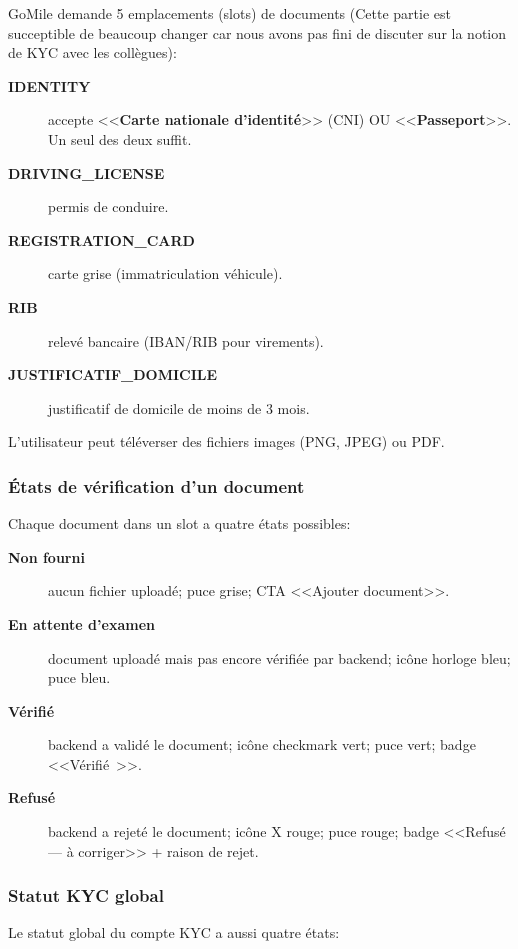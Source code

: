 GoMile demande 5 emplacements (slots) de documents (Cette partie est succeptible de beaucoup changer car nous avons pas fini de discuter sur la notion de KYC avec les collègues):

\begin{description}
    \item[\textbf{IDENTITY}] accepte <<\textbf{Carte nationale d'identité}>> (CNI) OU <<\textbf{Passeport}>>. Un seul des deux suffit.
    \item[\textbf{DRIVING\_LICENSE}] permis de conduire.
    \item[\textbf{REGISTRATION\_CARD}] carte grise (immatriculation véhicule).
    \item[\textbf{RIB}] relevé bancaire (IBAN/RIB pour virements).
    \item[\textbf{JUSTIFICATIF\_DOMICILE}] justificatif de domicile de moins de 3 mois.
\end{description}

L'utilisateur peut téléverser des fichiers images (PNG, JPEG) ou PDF.

\subsubsection{États de vérification d'un document}

Chaque document dans un slot a quatre états possibles:

\begin{description}
    \item[\textbf{Non fourni}] aucun fichier uploadé; puce grise; CTA <<Ajouter document>>.
    \item[\textbf{En attente d'examen}] document uploadé mais pas encore vérifiée par backend; icône horloge bleu; puce bleu.
    \item[\textbf{Vérifié}] backend a validé le document; icône checkmark vert; puce vert; badge <<Vérifié~\checkmark>>.
    \item[\textbf{Refusé}] backend a rejeté le document; icône X rouge; puce rouge; badge <<Refusé — à corriger>> + raison de rejet.
\end{description}

\subsubsection{Statut KYC global}

Le statut global du compte KYC a aussi quatre états:


